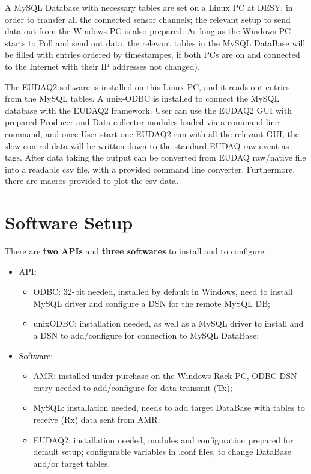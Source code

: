 \documentclass[a4paper,12pt]{scrartcl}
\begin{document}
A MySQL Database with necessary tables are set on a Linux PC at DESY, in order to transfer all the connected sensor channels; the relevant setup to send data out from the Windows PC is also prepared. As long as the Windows PC starts to Poll and send out data, the relevant tables in the MySQL DataBase will be filled with entries ordered by timestampes, if both PCs are on and connected to the Internet with their IP addresses not changed).

The EUDAQ2 software is installed on this Linux PC, and it reads out entries from the MySQL tables.
A unix-ODBC is installed to connect the MySQL database with the EUDAQ2 framework.
User can use the EUDAQ2 GUI with prepared Producer and Data collector modules loaded via a command line command, and once User start one EUDAQ2 run with all the relevant GUI, the slow control data will be written down to the standard EUDAQ raw event as tags.
After data taking the output can be converted from EUDAQ raw/native file into a readable csv file, with a provided command line converter. Furthermore, there are macros provided to plot the csv data.

\section{Software Setup}
There are \textbf{two APIs} and \textbf{three softwares} to install and to configure:
\begin{itemize}
  \item API:
  \begin{itemize}
    \item ODBC: 32-bit needed, installed by default in Windows, need to install MySQL driver and configure a DSN for the remote MySQL DB;
    \item unixODBC: installation needed, as well as a MySQL driver to install and a DSN to add/configure for connection to MySQL DataBase;
  \end{itemize}

  \item Software:
  \begin{itemize}
    \item AMR: installed under purchase on the Windows Rack PC, ODBC DSN entry needed to add/configure for data transmit (Tx);
    \item MySQL: installation needed, needs to add target DataBase with tables to receive (Rx) data sent from AMR;
    \item EUDAQ2: installation needed, modules and configuration prepared for default setup; configurable variables in .conf files, to change DataBase and/or target tables.
  \end{itemize}
\end{itemize}
\end{document}
